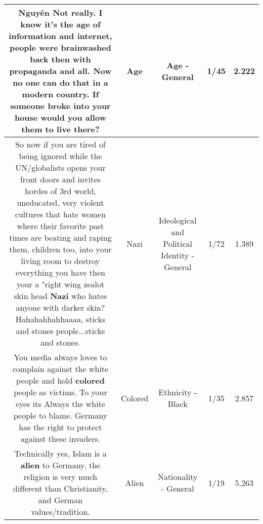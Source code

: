 \documentclass[11pt]{article}
\newlength\mylength
\begin{document}
\begin{center}
\begin{longtable}{|C{.65\mylength}|C{.30\mylength}|C{.12\mylength}|C{.12\mylength}|C{.12\mylength}|}
  \small {} Nguyên Not really. I know it's the \textbf{age} of information and internet, people were brainwashed back then with propaganda and all. Now no one can do that in a modern country. If someone broke into your house would you allow them to live there?\normalsize   & Age & Age - General & 1/45 & 2.222 \\  \hline
  \small So now if you are tired of being ignored while the UN/globalists opens your front doors and invites hordes of 3rd world, uneducated, very violent cultures that hate women where their favorite past times are beating and raping them, children too, into your living room to destroy everything you have then your a "right wing zealot skin head \textbf{Nazi} who hates anyone with darker skin?  Hahahahhahhaaaa, sticks and stones people...sticks and stones.\normalsize   & Nazi &  Ideological and Political Identity - General & 1/72 & 1.389 \\  \hline
  \small You media always loves to complain against the white people and hold \textbf{colored} people as victims. To your eyes its Always the white people to blame. Germany has the right to protect against these invaders.\normalsize   & Colored & Ethnicity - Black & 1/35 & 2.857 \\  \hline
  \small Technically yes, Islam is a \textbf{alien} to Germany, the religion is very much different than Christianity, and German values/tradition.\normalsize   & Alien & Nationality - General & 1/19 & 5.263 \\  \hline

\end{longtable}
\end{center}
\end{document}
